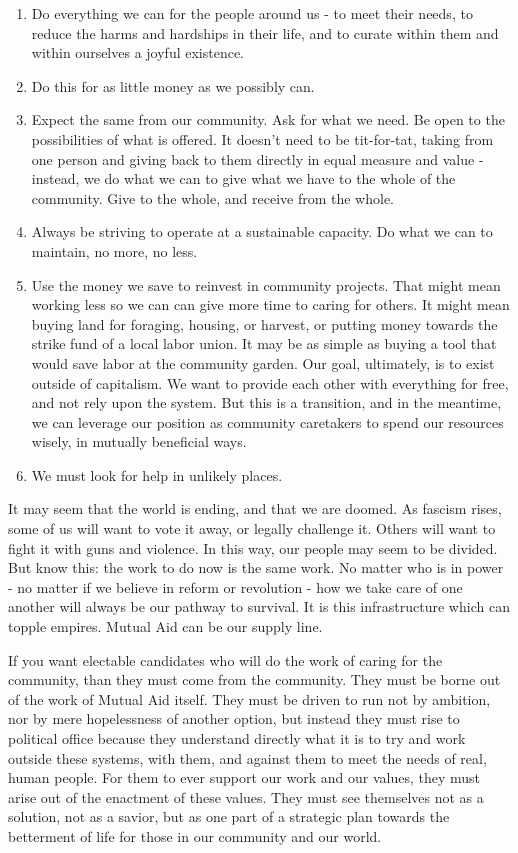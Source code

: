 \documentclass[
]{book}
\begin{document}
\begin{enumerate}
\def\labelenumi{\arabic{enumi}.}
\item
  Do everything we can for the people around us - to meet their needs, to reduce the harms and hardships in their life, and to curate within them and within ourselves a joyful existence.
\item
  Do this for as little money as we possibly can.
\item
  Expect the same from our community. Ask for what we need. Be open to the possibilities of what is offered. It doesn't need to be tit-for-tat, taking from one person and giving back to them directly in equal measure and value - instead, we do what we can to give what we have to the whole of the community. Give to the whole, and receive from the whole.
\item
  Always be striving to operate at a sustainable capacity. Do what we can to maintain, no more, no less.
\item
  Use the money we save to reinvest in community projects. That might mean working less so we can can give more time to caring for others. It might mean buying land for foraging, housing, or harvest, or putting money towards the strike fund of a local labor union. It may be as simple as buying a tool that would save labor at the community garden. Our goal, ultimately, is to exist outside of capitalism. We want to provide each other with everything for free, and not rely upon the system. But this is a transition, and in the meantime, we can leverage our position as community caretakers to spend our resources wisely, in mutually beneficial ways.
\item
  We must look for help in unlikely places.
\end{enumerate}

It may seem that the world is ending, and that we are doomed. As fascism rises, some of us will want to vote it away, or legally challenge it. Others will want to fight it with guns and violence. In this way, our people may seem to be divided. But know this: the work to do now is the same work. No matter who is in power - no matter if we believe in reform or revolution - how we take care of one another will always be our pathway to survival. It is this infrastructure which can topple empires. Mutual Aid can be our supply line.

If you want electable candidates who will do the work of caring for the community, than they must come from the community. They must be borne out of the work of Mutual Aid itself. They must be driven to run not by ambition, nor by mere hopelessness of another option, but instead they must rise to political office because they understand directly what it is to try and work outside these systems, with them, and against them to meet the needs of real, human people. For them to ever support our work and our values, they must arise out of the enactment of these values. They must see themselves not as a solution, not as a savior, but as one part of a strategic plan towards the betterment of life for those in our community and our world.
\end{document}

